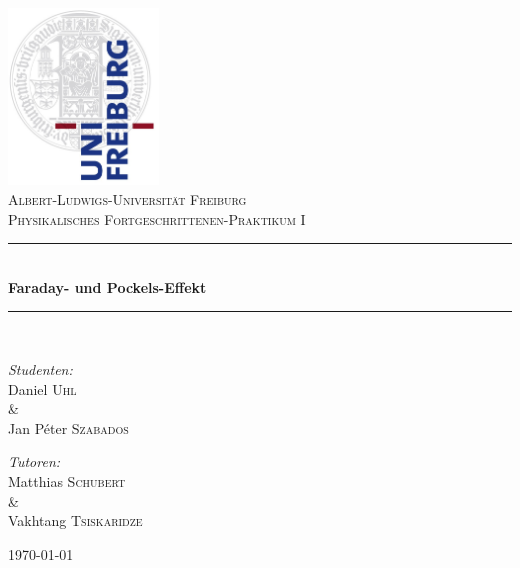 
\begin{titlepage}

\begin{center}



\includegraphics[width=0.3\textwidth]{Bilder/logo}\\[1.2cm]    

\textsc{\LARGE Albert-Ludwigs-Universit\"at Freiburg}\\[1.75cm]

\textsc{\Large Physikalisches Fortgeschrittenen-Praktikum I}\\[0.75cm]



\newcommand{\HRule}{\rule{\linewidth}{0.5mm}}
\HRule \\[0.5cm]
{ \huge \bfseries Faraday- und Pockels-Effekt}\\[0.5cm]

\HRule \\[1.75cm]


\begin{minipage}{0.4\textwidth}
\begin{flushleft} \large
\emph{Studenten:}\\
Daniel \textsc{Uhl}\\ \setlength{\parindent}{1.25cm} \& 
\setlength{\parindent}{0cm} \\ Jan P\'eter \textsc{Szabados} 
\end{flushleft}
\end{minipage}
\hfill
\begin{minipage}{0.4\textwidth}
\begin{flushright} \large
\emph{Tutoren:} \\
Matthias \textsc{Schubert}\\ \& ~~~~~~~~~~~~~
\\ Vakhtang \textsc{Tsiskaridze}
\end{flushright}
\end{minipage}

\vfill


{\large \today}

\end{center}

\end{titlepage}